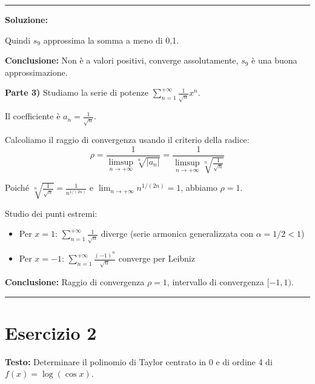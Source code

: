 \documentclass[12pt, a4paper]{article}
\newenvironment{solution}
{\par\noindent\rule{\textwidth}{0.4pt}\par\textbf{Soluzione:}\medskip\par}
{\par\rule{\textwidth}{0.4pt}\par\bigskip}
\begin{document}
\begin{solution}
Quindi $s_9$ approssima la somma a meno di 0,1.

\textbf{Conclusione:} Non è a valori positivi, converge assolutamente, $s_9$ è una buona approssimazione.

\vspace{0.5cm}

\textbf{Parte 3)} Studiamo la serie di potenze $\displaystyle\sum_{n=1}^{+\infty} \frac{1}{\sqrt{n}}x^{n}$.

Il coefficiente è $a_n = \frac{1}{\sqrt{n}}$.

Calcoliamo il raggio di convergenza usando il criterio della radice:
\[
\rho = \frac{1}{\limsup_{n \to +\infty} \sqrt[n]{|a_n|}} = \frac{1}{\limsup_{n \to +\infty} \sqrt[n]{\frac{1}{\sqrt{n}}}}
\]

Poiché $\sqrt[n]{\frac{1}{\sqrt{n}}} = \frac{1}{n^{1/(2n)}}$ e $\lim_{n \to +\infty} n^{1/(2n)} = 1$, abbiamo $\rho = 1$.

Studio dei punti estremi:
\begin{itemize}
    \item Per $x = 1$: $\displaystyle\sum_{n=1}^{+\infty} \frac{1}{\sqrt{n}}$ diverge (serie armonica generalizzata con $\alpha = 1/2 < 1$)
    \item Per $x = -1$: $\displaystyle\sum_{n=1}^{+\infty} \frac{(-1)^n}{\sqrt{n}}$ converge per Leibniz
\end{itemize}

\textbf{Conclusione:} Raggio di convergenza $\rho = 1$, intervallo di convergenza $[-1, 1)$.
\end{solution}

\newpage

\section*{Esercizio 2}

\textbf{Testo:} Determinare il polinomio di Taylor centrato in 0 e di ordine 4 di $f(x) = \log(\cos x)$.
\end{document}
